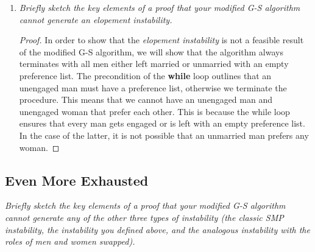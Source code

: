 \documentclass[11pt, oneside]{article}   	%
\theoremstyle{definition}
\theoremstyle{remark}
\begin{document}
\begin{enumerate}
\begin{enumerate}
   \end{enumerate}
	\item \textit{Briefly sketch the key elements of a proof that your modified G-S algorithm cannot generate an elopement instability.}
	
	\begin{proof}
		In order to show that the \textit{elopement instability} is not a feasible result of the modified G-S algorithm, we will show that the algorithm always terminates with all men either left married or unmarried with an empty preference list. The precondition of the \textbf{while} loop outlines that an unengaged man must have a preference list, otherwise we terminate the procedure. This means that we cannot have an unengaged man and unengaged woman that prefer each other. This is because the while loop ensures that every man gets engaged or is left with an empty preference list. In the case of the latter, it is not possible that an unmarried man prefers any woman.
	\end{proof}
\end{enumerate}

\subsection{Even More Exhausted}
\textit{Briefly sketch the key elements of a proof that your modified G-S
algorithm cannot generate any of the other three types of instability
(the classic SMP instability, the instability you defined above, and
the analogous instability with the roles of men and women swapped).}
\end{document}
